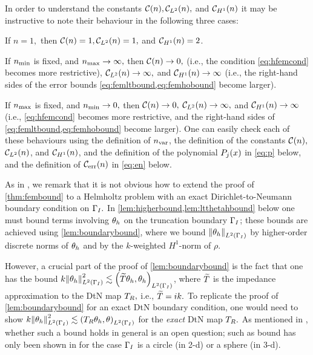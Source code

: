 In order to understand the constants $\mathcal C(n), \mathcal C_{L^{2}}(n),$ and $\mathcal C_{H^{1}}(n)$ it may be instructive to note their behaviour in the following three cases:
\bit
\item If $n=1,$ then $\mathcal C(n)=1, \mathcal C_{L^{2}}(n)=1,$ and $\mathcal C_{H^{1}}(n)=2$.
\item If $n_{\min}$ is fixed, and $n_{\max} \rightarrow \infty,$ then $\mathcal C(n)\rightarrow 0,$ (i.e., the condition \cref{eq:hfemcond} becomes more restrictive), $\mathcal C_{L^{2}}(n)\rightarrow \infty,$ and $\mathcal C_{H^{1}}(n)\rightarrow \infty$ (i.e., the right-hand sides of the error bounds \cref{eq:femltbound,eq:femhobound} become larger).
\item If $n_{\max}$ is fixed, and $n_{\min} \rightarrow 0,$ then $\mathcal C(n)\rightarrow 0,$ $\mathcal C_{L^{2}}(n)\rightarrow \infty,$ and $\mathcal C_{H^{1}}(n)\rightarrow \infty$ (i.e., \cref{eq:hfemcond} becomes more restrictive, and the right-hand sides of \cref{eq:femltbound,eq:femhobound} become larger).
  \eit
  One can easily check each of these behaviours using the definition of $n_{\mathrm{var}}$, the definition of the constants $\mathcal C(n),$ $\mathcal C_{L^{2}}(n)$, and $\mathcal C_{H^{1}}(n)$, and the definition of the polynomial $P_{j}(x)$ in \cref{eq:p} below, and the definition of $\En$ in \cref{eq:en} below.
  \ere

  As in \cite[Remark 5.4(e)]{DuWu:15}, we remark that it is not obvious how to extend the proof of \cref{thm:fembound} to a Helmholtz problem with an exact Dirichlet-to-Neumann boundary condition on $\Gamma_{I}.$ In \cref{lem:higherbound,lem:ltthetahbound} below one must bound terms involving $\theta_{h}$ on the truncation boundary $\Gamma_{I}$; these bounds are achieved using \cref{lem:boundarybound}, where we bound $\NLtGI{\thetah}$ by higher-order discrete norms of $\theta_{h}$ and by the $k$-weighted $H^1$-norm of $\rho.$

  However, a crucial part of the proof of \cref{lem:boundarybound} is the fact that one has the bound $k \NLtGI{\thetah}^2 \lesssim \IPLtGI{\DtNapprox \thetah}{\thetah}$, where $\widetilde{T}$ is the impedance approximation to the DtN map $T_{R},$ i.e., $\widetilde{T} = ik.$ To replicate the proof of \cref{lem:boundarybound} for an exact DtN boundary condition, one would need to show $k \NLtGI{\thetah}^2 \lesssim \IPLtGI{\DtN \thetah}{\theta}$ for the \emph{exact} DtN map $T_{R}.$ As mentioned in \cite[Remark 5.4(e)]{DuWu:15}, whether such a bound holds in general is an open question; such as bound has only been shown in \cite[Equation (3.4b)]{MeSa:10} for the case $\Gamma_{I}$ is a circle (in 2-d) or a sphere (in 3-d).
  \ere

